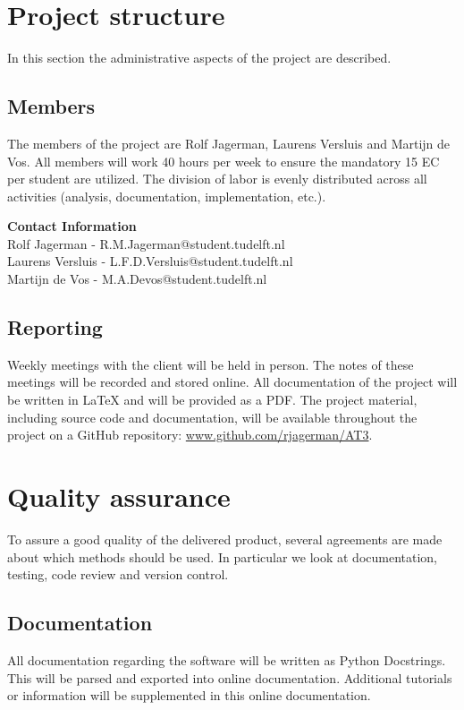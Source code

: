 \section{Project structure}

In this section the administrative aspects of the project are described.

\subsection{Members}
The members of the project are Rolf Jagerman, Laurens Versluis and Martijn de Vos. All members will work 40 hours per week to ensure the mandatory 15 EC per student are utilized. The division of labor is evenly distributed across all activities (analysis, documentation, implementation, etc.).

\noindent \textbf{Contact Information}\\
Rolf Jagerman - R.M.Jagerman@student.tudelft.nl\\
Laurens Versluis - L.F.D.Versluis@student.tudelft.nl\\
Martijn de Vos - M.A.Devos@student.tudelft.nl

\subsection{Reporting}
Weekly meetings with the client will be held in person. The notes of these meetings will be recorded and stored online. All documentation of the project will be written in {\LaTeX} and will be provided as a PDF. The project material, including source code and documentation, will be available throughout the project on a GitHub repository: \href{http://www.github.com/rjagerman/AT3/}{www.github.com/rjagerman/AT3}.

\section{Quality assurance}

To assure a good quality of the delivered product, several agreements are made about which methods should be used. In particular we look at documentation, testing, code review and version control.

\subsection{Documentation}
All documentation regarding the software will be written as Python Docstrings. This will be parsed and exported into online documentation. Additional tutorials or information will be supplemented in this online documentation.

